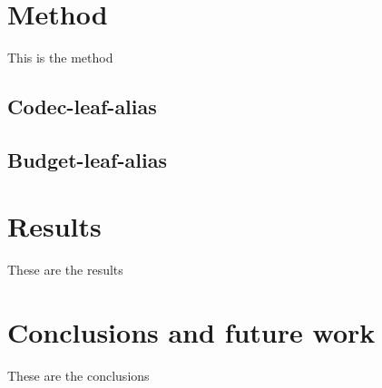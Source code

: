 \documentclass[sigconf]{acmart}
\begin{document}
\section{Method}\label{sec:method}
This is the method
\subsection{Codec-leaf-alias}
\subsection{Budget-leaf-alias}

\section{Results} \label{sec:results}
These are the results 

\section{Conclusions and future work} \label{sec:conclusions}
These are the conclusions


\end{document}
